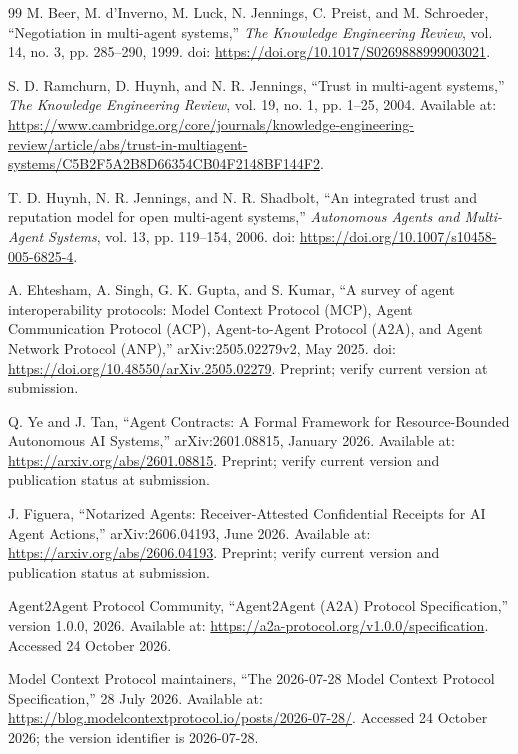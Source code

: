 \documentclass[12pt,a4paper,oneside]{report}
\begin{document}
\begin{thebibliography}{99}
M. Beer, M. d'Inverno, M. Luck, N. Jennings, C. Preist, and M. Schroeder,
``Negotiation in multi-agent systems,'' \emph{The Knowledge Engineering Review},
vol. 14, no. 3, pp. 285--290, 1999. doi: \url{https://doi.org/10.1017/S0269888999003021}.

S. D. Ramchurn, D. Huynh, and N. R. Jennings,
``Trust in multi-agent systems,'' \emph{The Knowledge Engineering Review},
vol. 19, no. 1, pp. 1--25, 2004. Available at: \url{https://www.cambridge.org/core/journals/knowledge-engineering-review/article/abs/trust-in-multiagent-systems/C5B2F5A2B8D66354CB04F2148BF144F2}.

T. D. Huynh, N. R. Jennings, and N. R. Shadbolt, ``An integrated trust and reputation model for open multi-agent systems,'' \emph{Autonomous Agents and Multi-Agent Systems}, vol. 13, pp. 119--154, 2006. doi: \url{https://doi.org/10.1007/s10458-005-6825-4}.

A. Ehtesham, A. Singh, G. K. Gupta, and S. Kumar, ``A survey of agent interoperability protocols: Model Context Protocol (MCP), Agent Communication Protocol (ACP), Agent-to-Agent Protocol (A2A), and Agent Network Protocol (ANP),'' arXiv:2505.02279v2, May 2025. doi: \url{https://doi.org/10.48550/arXiv.2505.02279}. Preprint; verify current version at submission.

Q. Ye and J. Tan, ``Agent Contracts: A Formal Framework for Resource-Bounded Autonomous AI Systems,'' arXiv:2601.08815, January 2026. Available at: \url{https://arxiv.org/abs/2601.08815}. Preprint; verify current version and publication status at submission.

J. Figuera, ``Notarized Agents: Receiver-Attested Confidential Receipts for AI Agent Actions,'' arXiv:2606.04193, June 2026. Available at: \url{https://arxiv.org/abs/2606.04193}. Preprint; verify current version and publication status at submission.

Agent2Agent Protocol Community, ``Agent2Agent (A2A) Protocol Specification,''
version 1.0.0, 2026. Available at: \url{https://a2a-protocol.org/v1.0.0/specification}.
Accessed 24 October 2026.

Model Context Protocol maintainers, ``The 2026-07-28 Model Context Protocol Specification,''
28 July 2026. Available at: \url{https://blog.modelcontextprotocol.io/posts/2026-07-28/}.
Accessed 24 October 2026; the version identifier is 2026-07-28.


\end{thebibliography}
\end{document}
